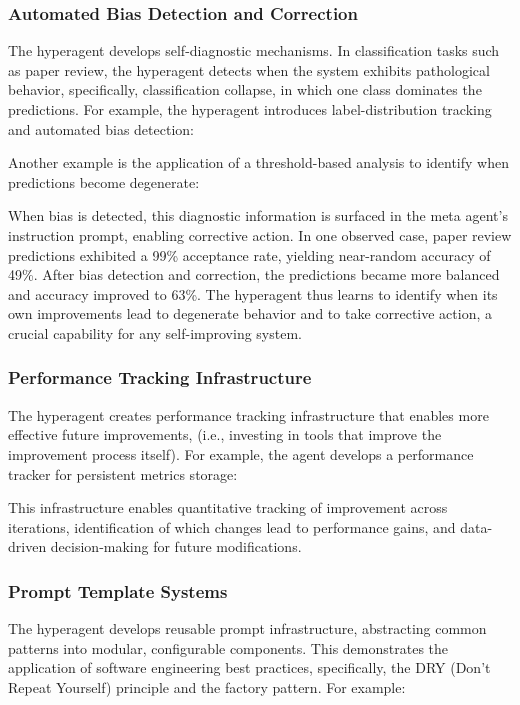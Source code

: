 \documentclass[]{fairmeta}
\begin{document}
\subsubsection{Automated Bias Detection and Correction}

The hyperagent develops self-diagnostic mechanisms. In classification tasks such as paper review, the hyperagent detects when the system exhibits pathological behavior, specifically, classification collapse, in which one class dominates the predictions. For example, the hyperagent introduces label-distribution tracking and automated bias detection:


Another example is the application of a threshold-based analysis to identify when predictions become degenerate:


When bias is detected, this diagnostic information is surfaced in the meta agent's instruction prompt, enabling corrective action. In one observed case, paper review predictions exhibited a 99\% acceptance rate, yielding near-random accuracy of 49\%. After bias detection and correction, the predictions became more balanced and accuracy improved to 63\%. The hyperagent thus learns to identify when its own improvements lead to degenerate behavior and to take corrective action, a crucial capability for any self-improving system.

\subsubsection{Performance Tracking Infrastructure}

The hyperagent creates performance tracking infrastructure that enables more effective future improvements, (i.e., investing in tools that improve the improvement process itself).
For example, the agent develops a performance tracker for persistent metrics storage:


This infrastructure enables quantitative tracking of improvement across iterations, identification of which changes lead to performance gains, and data-driven decision-making for future modifications.

\subsubsection{Prompt Template Systems}

The hyperagent develops reusable prompt infrastructure, abstracting common patterns into modular, configurable components. This demonstrates the application of software engineering best practices, specifically, the DRY (Don't Repeat Yourself) principle and the factory pattern.
For example:

\end{document}
